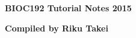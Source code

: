 \begin{titlepage}

\begin{center}

\HRule
\vspace{0.4cm}
\Huge{\textbf{BIOC192 Tutorial Notes 2015}}
\HRule

\vfill
\LARGE{\textbf{Compiled by Riku Takei}}

\end{center}

\end{titlepage}
